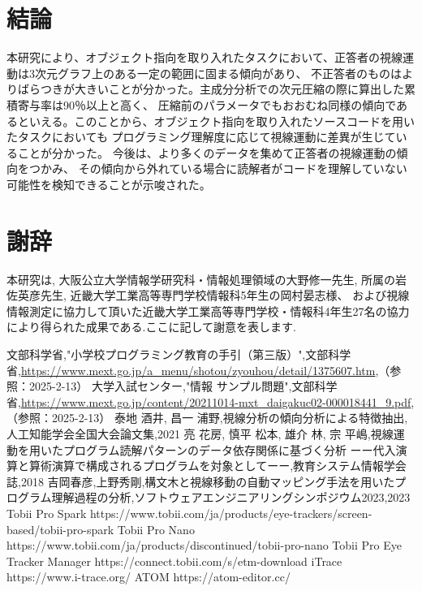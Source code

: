 \documentclass[paper=a4paper,fontsize=11pt]{jlreq}
\begin{document}
\part{結論}
本研究により、オブジェクト指向を取り入れたタスクにおいて、正答者の視線運動は3次元グラフ上のある一定の範囲に固まる傾向があり、
不正答者のものはよりばらつきが大きいことが分かった。主成分分析での次元圧縮の際に算出した累積寄与率は90％以上と高く、
圧縮前のパラメータでもおおむね同様の傾向であるといえる。このことから、オブジェクト指向を取り入れたソースコードを用いたタスクにおいても
プログラミング理解度に応じて視線運動に差異が生じていることが分かった。
今後は、より多くのデータを集めて正答者の視線運動の傾向をつかみ、
その傾向から外れている場合に読解者がコードを理解していない可能性を検知できることが示唆された。

\pagebreak

\part*{謝辞}
本研究は,
大阪公立大学情報学研究科・情報処理領域の大野修一先生,
所属の岩佐英彦先生,
近畿大学工業高等専門学校情報科5年生の岡村晏志様、
および視線情報測定に協力して頂いた近畿大学工業高等専門学校・情報科4年生27名の協力により得られた成果である.ここに記して謝意を表します.

\pagebreak

\begin{thebibliography}{99}
   文部科学省,"小学校プログラミング教育の手引（第三版）",文部科学省,\url{https://www.mext.go.jp/a_menu/shotou/zyouhou/detail/1375607.htm},（参照：2025-2-13）
   大学入試センター,"情報 サンプル問題",文部科学省,\url{https://www.mext.go.jp/content/20211014-mxt_daigakuc02-000018441_9.pdf},（参照：2025-2-13）
   泰地 酒井, 昌一 浦野,視線分析の傾向分析による特徴抽出,人工知能学会全国大会論文集,2021
   亮 花房, 慎平 松本, 雄介 林, 宗 平嶋,視線運動を用いたプログラム読解パターンのデータ依存関係に基づく分析
  ーー代入演算と算術演算で構成されるプログラムを対象としてーー,教育システム情報学会誌,2018
   吉岡春彦,上野秀剛,構文木と視線移動の自動マッピング手法を用いたプログラム理解過程の分析,ソフトウェアエンジニアリングシンポジウム2023,2023
   Tobii Pro Spark https://www.tobii.com/ja/products/eye-trackers/screen-based/tobii-pro-spark
   Tobii Pro Nano https://www.tobii.com/ja/products/discontinued/tobii-pro-nano
   Tobii Pro Eye Tracker Manager https://connect.tobii.com/s/etm-download
   iTrace https://www.i-trace.org/
   ATOM https://atom-editor.cc/
\end{thebibliography}
\end{document}
